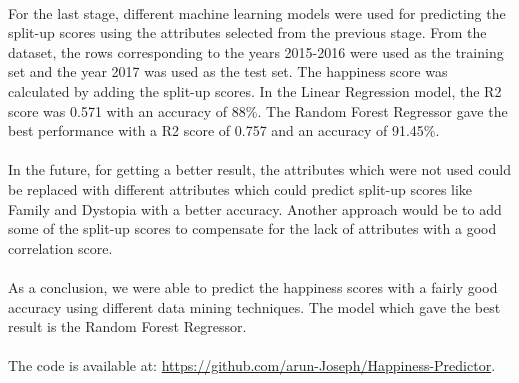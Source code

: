 \documentclass[twocolumn]{article}
\begin{document}
\paragraph{}
For the last stage, different machine learning models were used for predicting
the split-up scores using the attributes selected from the previous stage. From the dataset, the rows corresponding to the years 2015-2016 were used as the training set and the year 2017 was used as the test set. The happiness score was calculated by adding the split-up scores. In the Linear Regression model, the R2 score was 0.571 with an accuracy of 88\%. The Random Forest Regressor gave the best performance with a R2 score of 0.757 and an accuracy of 91.45\%.

\paragraph{}
In the future, for getting a better result, the attributes which were not used could be replaced with different attributes which could predict split-up scores like Family and Dystopia with a better accuracy. Another approach would be to add some of the split-up scores to compensate for the lack of attributes with a good correlation score.

\paragraph{}
As a conclusion, we were able to predict the happiness scores with a fairly good accuracy using different data mining techniques. The model which gave the best result is the Random Forest Regressor.

\paragraph{}
The code is available at: \href{https://github.com/arun-Joseph/Happiness-Predictor}{https://github.com/arun-Joseph/Happiness-Predictor}.
\end{document}
